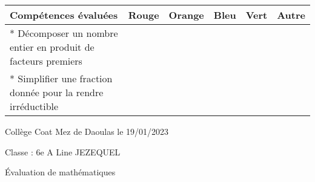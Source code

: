 \documentclass[a4paper,12pt,fleqn]{article}
\begin{document}
\begin{footnotesize}

\begin{center}

\begin{tabular}{|p{120mm}|p{8mm}|p{10mm}|p{8mm}|p{8mm}|p{8mm}|}

\hline
\textbf{Compétences évaluées} & \textbf{Rouge} & \textbf{Orange} & \textbf{Bleu} & \textbf{Vert} & \textbf{Autre} \\
\hline


*  Décomposer un nombre entier en produit de facteurs premiers  & & & & & \\ 
\hline
*  Simplifier une fraction donnée pour la rendre irréductible  & & & & & \\ 
\hline
\end{tabular}
\end{center}
\end{footnotesize}
 \par 
\medskip
 \par 
\medskip
\newpage
\setcounter{exo}{0}


Collège Coat Mez de Daoulas  \hfill  le 19/01/2023

Classe : 6e A \hfill Line JEZEQUEL

\begin{center}
\begin{LARGE} Évaluation de mathématiques \end{LARGE}
\end{center}

\end{document}
